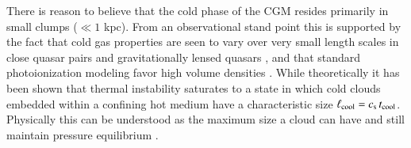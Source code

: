 \documentclass[11pt,letterpaper,english]{article}
\begin{document}
There is reason to believe that the cold phase of the CGM resides primarily in small clumps ($\ll 1$ kpc).  From an observational stand point this is supported by the fact that cold gas properties are seen to vary over very small length scales in close quasar pairs and gravitationally lensed quasars \cite{Rauch02, Churchill03, Lopez18}, and that standard photoionization modeling favor high volume densities \cite{Werk14,Lau16}. While theoretically it has been shown that thermal instability saturates to a state in which cold clouds embedded within a confining hot medium have a characteristic size $\ell_{\rm cool} = c_{\rm s}\, t_{\rm cool}$. Physically this can be understood as the maximum size a cloud can have and still maintain pressure equilibrium \cite{McCourt18}. 




\end{document}

